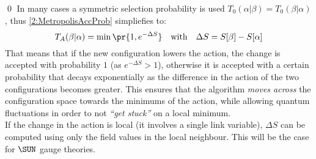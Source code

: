 \qed
In many cases a symmetric selection probability is used $T_0(\alpha|\beta)=T_0(\beta|\alpha)$, thus \eqref{2:MetropolisAccProb} simpliefies to:
\begin{equation}
    T_A(\beta|\alpha) = \min\pr{1, e^{-\Delta S}} \quad \text{with} \quad \Delta S = S[\beta]-S[\alpha] \label{2:MetropolisAccProbSymm}
\end{equation}
That means that if the new configuration lowers the action, the change is accepted with probability $1$ (as $e^{-\Delta S}>1$), otherwise it is accepted with a certain probability that decays exponentially as the difference in the action of the two configurations becomes greater.
This ensures that the algorithm \emph{moves across} the configuration space towards the minimums of the action, while allowing quantum fluctuations in order to not \emph{``get stuck''} on a local minimum.\\
If the change in the action is local (it involves a single link variable), $\Delta S$ can be computed using only the field values in the local neighbour. This will be the case for $\SUN$ gauge theories.

